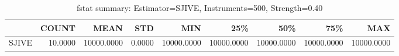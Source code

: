 \begin{table}[ht]
\centering
\caption{fstat summary: Estimator=SJIVE, Instruments=500, Strength=0.40}
\begin{tabular}{lrrrrrrrr}
\toprule
 & COUNT & MEAN & STD & MIN & 25\% & 50\% & 75\% & MAX \\
\midrule
SJIVE & 10.0000 & 10000.0000 & 0.0000 & 10000.0000 & 10000.0000 & 10000.0000 & 10000.0000 & 10000.0000 \\
\bottomrule
\end{tabular}
\end{table}
